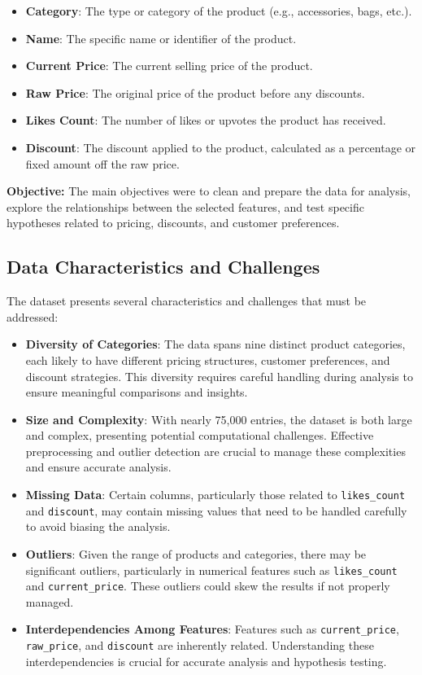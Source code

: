\documentclass[a4paper,11pt]{article}
\begin{document}
\begin{itemize}
    \item \textbf{Category}: The type or category of the product (e.g., accessories, bags, etc.).
    \item \textbf{Name}: The specific name or identifier of the product.
    \item \textbf{Current Price}: The current selling price of the product.
    \item \textbf{Raw Price}: The original price of the product before any discounts.
    \item \textbf{Likes Count}: The number of likes or upvotes the product has received.
    \item \textbf{Discount}: The discount applied to the product, calculated as a percentage or fixed amount off the raw price.
\end{itemize}

\textbf{Objective:} The main objectives were to clean and prepare the data for analysis, explore the relationships between the selected features, and test specific hypotheses related to pricing, discounts, and customer preferences.

\subsection{Data Characteristics and Challenges}

The dataset presents several characteristics and challenges that must be addressed:

\begin{itemize}
    \item \textbf{Diversity of Categories}: The data spans nine distinct product categories, each likely to have different pricing structures, customer preferences, and discount strategies. This diversity requires careful handling during analysis to ensure meaningful comparisons and insights.
    \item \textbf{Size and Complexity}: With nearly 75,000 entries, the dataset is both large and complex, presenting potential computational challenges. Effective preprocessing and outlier detection are crucial to manage these complexities and ensure accurate analysis.
    \item \textbf{Missing Data}: Certain columns, particularly those related to \texttt{likes\_count} and \texttt{discount}, may contain missing values that need to be handled carefully to avoid biasing the analysis.
    \item \textbf{Outliers}: Given the range of products and categories, there may be significant outliers, particularly in numerical features such as \texttt{likes\_count} and \texttt{current\_price}. These outliers could skew the results if not properly managed.
    \item \textbf{Interdependencies Among Features}: Features such as \texttt{current\_price}, \texttt{raw\_price}, and \texttt{discount} are inherently related. Understanding these interdependencies is crucial for accurate analysis and hypothesis testing.
\end{itemize}
\end{document}
